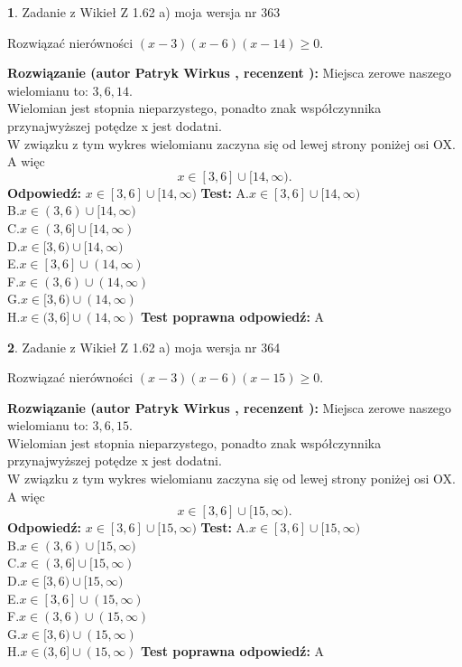 \documentclass[12pt, a4paper]{article}
\theoremstyle{definition} %
\newtheorem{zad}{}
\newcommand{\zadStart}[1]{\begin{zad}#1\newline}
\newcommand{\zadStop}{\end{zad}}
\newcommand{\rozwStart}[2]{\noindent \textbf{Rozwiązanie (autor #1 , recenzent #2): }\newline}
\newcommand{\rozwStop}{\newline}
\newcommand{\odpStart}{\noindent \textbf{Odpowiedź:}\newline}
\newcommand{\odpStop}{\newline}
\newcommand{\testStart}{\noindent \textbf{Test:}\newline}
\newcommand{\testStop}{\newline}
\newcommand{\kluczStart}{\noindent \textbf{Test poprawna odpowiedź:}\newline}
\newcommand{\kluczStop}{\newline}
\begin{document}
\zadStart{Zadanie z Wikieł Z 1.62 a) moja wersja nr 363}

Rozwiązać nierówności $(x-3)(x-6)(x-14)\ge0$.
\zadStop
\rozwStart{Patryk Wirkus}{}
Miejsca zerowe naszego wielomianu to: $3, 6, 14$.\\
Wielomian jest stopnia nieparzystego, ponadto znak współczynnika przy\linebreak najwyższej potędze x jest dodatni.\\ W związku z tym wykres wielomianu zaczyna się od lewej strony poniżej osi OX. A więc $$x \in [3,6] \cup [14,\infty).$$
\rozwStop
\odpStart
$x \in [3,6] \cup [14,\infty)$
\odpStop
\testStart
A.$x \in [3,6] \cup [14,\infty)$\\
B.$x \in (3,6) \cup [14,\infty)$\\
C.$x \in (3,6] \cup [14,\infty)$\\
D.$x \in [3,6) \cup [14,\infty)$\\
E.$x \in [3,6] \cup (14,\infty)$\\
F.$x \in (3,6) \cup (14,\infty)$\\
G.$x \in [3,6) \cup (14,\infty)$\\
H.$x \in (3,6] \cup (14,\infty)$
\testStop
\kluczStart
A
\kluczStop



\zadStart{Zadanie z Wikieł Z 1.62 a) moja wersja nr 364}

Rozwiązać nierówności $(x-3)(x-6)(x-15)\ge0$.
\zadStop
\rozwStart{Patryk Wirkus}{}
Miejsca zerowe naszego wielomianu to: $3, 6, 15$.\\
Wielomian jest stopnia nieparzystego, ponadto znak współczynnika przy\linebreak najwyższej potędze x jest dodatni.\\ W związku z tym wykres wielomianu zaczyna się od lewej strony poniżej osi OX. A więc $$x \in [3,6] \cup [15,\infty).$$
\rozwStop
\odpStart
$x \in [3,6] \cup [15,\infty)$
\odpStop
\testStart
A.$x \in [3,6] \cup [15,\infty)$\\
B.$x \in (3,6) \cup [15,\infty)$\\
C.$x \in (3,6] \cup [15,\infty)$\\
D.$x \in [3,6) \cup [15,\infty)$\\
E.$x \in [3,6] \cup (15,\infty)$\\
F.$x \in (3,6) \cup (15,\infty)$\\
G.$x \in [3,6) \cup (15,\infty)$\\
H.$x \in (3,6] \cup (15,\infty)$
\testStop
\kluczStart
A
\kluczStop
\end{document}
